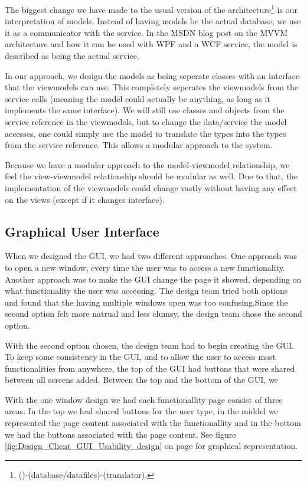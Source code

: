 The biggest change we have made to the usual version of the architecture\footnote{()-(database/datafiles)-(translator).} is our interpretation of models. Instead of having models be the actual database, we use it as a communicator with the service. In the MSDN blog post on the MVVM architecture \cite{MSDN-WPF-MVVM} and how it can be used with WPF and a WCF service, the model is described as being the actual service. 

In our approach, we design the models as being seperate classes with an interface that the viewmodels can use. This completely seperates the viewmodels from the service calls (meaning the model could actually be anything, as long as it implements the same interface). We will still use classes and objects from the service reference in the viewmodels, but to change the data/service the model accesses, one could simply use the model to translate the types into the types from the service reference. This allows a modular approach to the system.

Because we have a modular approach to the model-viewmodel relationship, we feel the view-viewmodel relationship should be modular as well.  Due to that, the implementation of the viewmodels could change vastly without having any effect on the views (except if it changes interface).

\subsection{Graphical User Interface}
\label{Design_Client_GUI}
When we designed the GUI, we had two different approaches. One approach was to open a new window, every time the user was to access a new functionality. Another approach was to make the GUI change the page it showed, depending on what functionality the user was accessing. The design team tried both options and found that the having multiple windows open was too confusing.Since the second option felt more natrual and less clumsy, the design team chose the second option.

With the second option chosen, the design team had to begin creating the GUI. To keep some consistency in the GUI, and to allow the user to access most functionalities from anywhere, the top of the GUI had buttons that were shared between all screens added. Between the top and the bottom of the GUI, we 

With the one window design we had each functionallity page consist of three areas: In the top we had shared buttons for the user type, in the middel we represented the page content associated with the functionallity and in the bottom we had the buttons associated with the page content. See figure \ref{fig:Design_Client_GUI_Usability_design} on page \pageref{fig:Design_Client_GUI_Usability_design} for graphical representation.

